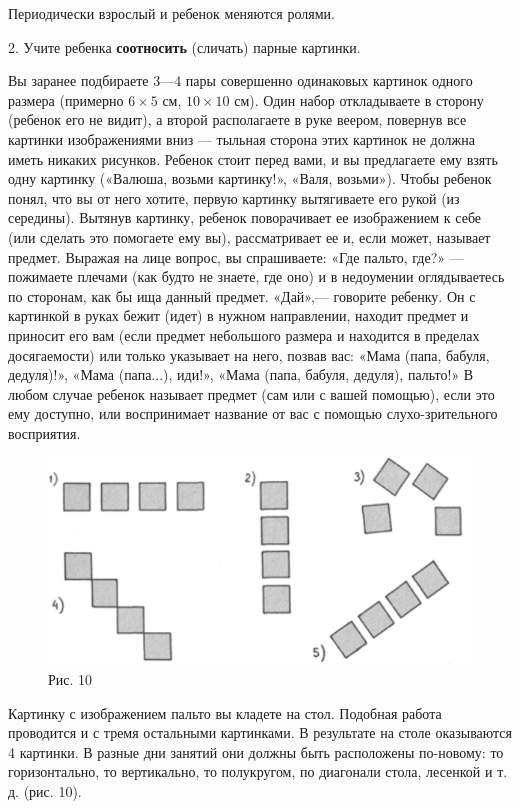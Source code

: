 \documentclass{book}
\begin{document}
Периодически взрослый и ребенок меняются ролями.

2. Учите ребенка \textbf{соотносить} (сличать) парные картинки.

Вы заранее подбираете 3---4 пары совершенно одинаковых картинок одного
размера (примерно $6 \times 5$ см, $10 \times 10$ см). Один набор откладываете в сторону
(ребенок его не видит), а второй располагаете в руке веером, повернув
все картинки изображениями вниз --- тыльная сторона этих картинок не
должна иметь никаких рисунков. Ребенок стоит перед вами, и вы
предлагаете ему взять одну картинку («Валюша, возьми картинку!», «Валя,
возьми»). Чтобы ребенок понял, что вы от него хотите, первую картинку
вытягиваете его рукой (из середины). Вытянув картинку, ребенок
поворачивает ее изображением к себе (или сделать это помогаете ему вы),
рассматривает ее и, если может, называет предмет. Выражая на лице
вопрос, вы спрашиваете: «Где пальто, где?» --- пожимаете плечами (как
будто не знаете, где оно) и в недоумении оглядываетесь по сторонам, как
бы ища данный предмет. «Дай»,--- говорите ребенку. Он с картинкой в
руках бежит (идет) в нужном направлении, находит предмет и приносит его
вам (если предмет небольшого размера и находится в пределах
досягаемости) или только указывает на него, позвав вас: «Мама (папа,
бабуля, дедуля)!», «Мама (папа...), иди!», «Мама (папа, бабуля, дедуля),
пальто!» В любом случае ребенок называет предмет (сам или с вашей
помощью), если это ему доступно, или воспринимает название от вас с
помощью слухо-зрительного восприятия.

\begin{figure}
\centering
\includegraphics[width=\linewidth]{media/media/image10.png}
\caption*{Рис. 10}
\end{figure}

Картинку с изображением пальто вы кладете на стол. Подобная работа
проводится и с тремя остальными картинками. В результате на столе
оказываются 4 картинки. В разные дни занятий они должны быть расположены
по-новому: то горизонтально, то вертикально, то полукругом, по диагонали
стола, лесенкой и т. д. (рис. 10).
\end{document}
